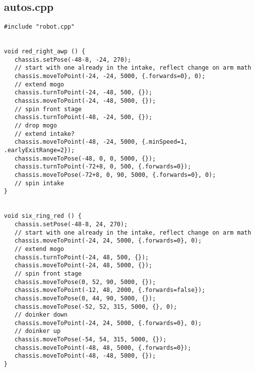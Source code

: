 \subsection*{autos.cpp}
\begin{verbatim}
#include "robot.cpp"


void red_right_awp () {
   chassis.setPose(-48-8, -24, 270);
   // start with one already in the intake, reflect change on arm math
   chassis.moveToPoint(-24, -24, 5000, {.forwards=0}, 0);
   // extend mogo
   chassis.turnToPoint(-24, -48, 500, {});
   chassis.moveToPoint(-24, -48, 5000, {});
   // spin front stage
   chassis.turnToPoint(-48, -24, 500, {});
   // drop mogo
   // extend intake?
   chassis.moveToPoint(-48, -24, 5000, {.minSpeed=1, .earlyExitRange=2});
   chassis.moveToPose(-48, 0, 0, 5000, {});
   chassis.turnToPoint(-72+8, 0, 500, {.forwards=0});
   chassis.moveToPose(-72+8, 0, 90, 5000, {.forwards=0}, 0);
   // spin intake
}


void six_ring_red () {
   chassis.setPose(-48-8, 24, 270);
   // start with one already in the intake, reflect change on arm math
   chassis.moveToPoint(-24, 24, 5000, {.forwards=0}, 0);
   // extend mogo
   chassis.turnToPoint(-24, 48, 500, {});
   chassis.moveToPoint(-24, 48, 5000, {});
   // spin front stage
   chassis.moveToPose(0, 52, 90, 5000, {});
   chassis.moveToPoint(-12, 48, 2000, {.forwards=false});
   chassis.moveToPose(0, 44, 90, 5000, {});
   chassis.moveToPose(-52, 52, 315, 5000, {}, 0);
   // doinker down
   chassis.moveToPoint(-24, 24, 5000, {.forwards=0}, 0);
   // doinker up
   chassis.moveToPose(-54, 54, 315, 5000, {});
   chassis.moveToPoint(-48, 48, 5000, {.forwards=0});
   chassis.moveToPoint(-48, -48, 5000, {});
}



\end{verbatim}
